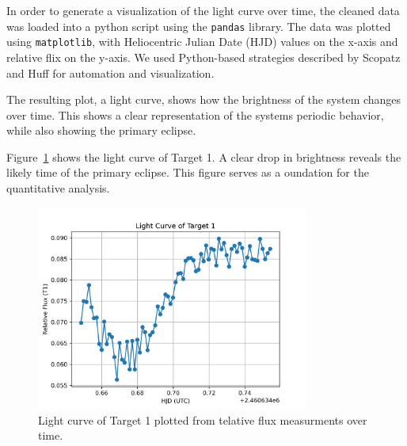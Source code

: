 In order to generate a visualization of the light curve over time, the cleaned data was loaded into
a python script using the \texttt{pandas} library. The data was plotted using \texttt{matplotlib}, 
with Heliocentric Julian Date (HJD) values on the x-axis and relative flix on the y-axis.
We used Python-based strategies described by Scopatz and Huff \cite{scopatz2015effective} 
for automation and visualization.

The resulting plot, a light curve, shows how the brightness of the system changes over time. This 
shows a clear representation of the systems periodic behavior, while also showing the primary 
eclipse.

Figure~\ref{fig:lightcurve} shows the light curve of Target 1. A clear drop in brightness reveals 
the likely time of the primary eclipse. This figure serves as a oundation for the quantitative 
analysis.

\begin{figure}[h!]
	\centering 
	\includegraphics[width=0.8\textwidth]{figs/light_curve.png}
	\caption{Light curve of Target 1 plotted from telative flux measurments over time.}
	\label{fig:lightcurve}
\end{figure}
